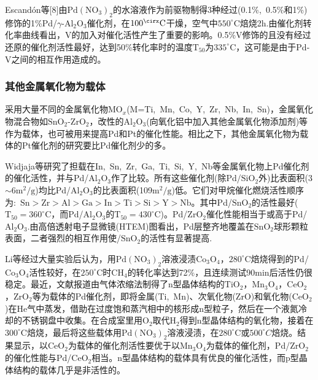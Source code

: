 \textrm{Escand\'on}等[8]由$\mathrm{Pd}(\mathrm{NO}_3)_2$的水溶液作为前驱物制得3种经过(0.1\%,~0.5\%和1\%)修饰的1\%\textrm{Pd}/$\gamma$-$\mathrm{Al}_2\mathrm{O}_3$催化剂，在$100^{\cirx}\mathrm{C}$干燥，空气中$550^{\circ}\mathrm{C}$焙烧2\textrm{h}.由催化剂转化率曲线看出，\textrm{V}的加入对催化活性产生了重要的影响。0.5\%\textrm{V}修饰的且没有经过还原的催化剂活性最好，达到50\%转化率时的温度$\mathrm{T}_{50}$为$335^{\circ}\mathrm{C}$，这可能是由于\textrm{Pd}-\textrm{V}之间的相互作用造成的。

\subsubsection{其他金属氧化物为载体}
采用大量不同的金属氧化物$\mathrm{MO}_x$(\textrm{M=Ti,~Mn,~Co,~Y,~Zr,~Nb,~In,~Sn})，金属氧化物混合物如$\mathrm{SnO}_2$-$\mathrm{ZrO}_2$，改性的$\mathrm{Al}_2\mathrm{O}_3$(向氧化铝中加入其他金属氧化物添加剂)等作为载体，也可被用来提高\textrm{Pd}和\textrm{Pt}的催化性能。相比之下，其他金属氧化物为载体的\textrm{Pt}催化剂的研究要比\textrm{Pd}催化剂少的多。

\textrm{Widjaja}等\cite{CataD59-69_2000}研究了担载在\textrm{In,~Sn,~Zr,~Ga,~Ti,~Si,~Y,~Nb}等金属氧化物上\textrm{Pd}催化剂的催化活性，并与\textrm{Pd}/$\mathrm{Al}_2\mathrm{O}_3$作了比较。所有这些催化剂(除\textrm{Pd}/$\mathrm{SiO}_2$外)比表面积(3$\sim$6$\mathrm{m}^2/\mathrm{g}$)均比\textrm{Pd}/$\mathrm{Al}_2\mathrm{O}_3$的比表面积(109$\mathrm{m}^2/\mathrm{g}$)低。它们对甲烷催化燃烧活性顺序为:~$\mathrm{Sn}>\mathrm{Zr}>\mathrm{Al}>\mathrm{Ga}>\mathrm{In}>\mathrm{Ti}>\mathrm{Si}>\mathrm{Y}>\mathrm{Nb}$。其中\textrm{Pd}/$\mathrm{SnO}_2$的活性最好($\mathrm{T}_{50}=360^{\circ}\mathrm{C}$，而\textrm{Pd}/$\mathrm{Al}_2\mathrm{O}_3$的$\mathrm{T}_{50}=430^{\circ}\mathrm{C}$)。\textrm{Pd}/$\mathrm{ZrO}_2$催化性能相当于或高于\textrm{Pd}/$\mathrm{Al}_2\mathrm{O}_3$.由高倍透射电子显微镜(\textrm{HTEM})图看出，\textrm{Pd}层整齐地覆盖在$\mathrm{SnO}_2$球形颗粒表面，二者强烈的相互作用使/$\mathrm{SnO}_2$的活性有显著提高.

\textrm{Li}等\cite{RKCL66-367_1999}经过大量实验后认为，用$\mathrm{Pd}(\mathrm{NO}_3)_2$溶液浸渍$\mathrm{Co}_3\mathrm{O}_4$，$280^{\circ}\mathrm{C}$焙烧得到的\textrm{Pd}/$\mathrm{Co}_3\mathrm{O}_4$活性较好，在$250^{\circ}\mathrm{C}$时$\mathrm{CH}_4$的转化率达到72\%，且连续测试90\textrm{min}后活性仍很稳定。最近，文献\cite{RKCL70-97_2000}报道由气体浓缩法制得了\textrm{n}型晶体结构的$\mathrm{TiO}_2$，$\mathrm{Mn}_3\mathrm{O}_4$，$\mathrm{CeO}_2$，$\mathrm{ZrO}_2$等为载体的\textrm{Pd}催化剂，即将金属(\textrm{Ti,~Mn})、次氧化物(\textrm{ZrO})和氧化物($\mathrm{CeO}_2$)在\textrm{He}气中蒸发，借助在过度饱和蒸汽相中的核形成\textrm{n}型粒子，然后在一个液氮冷却的不锈钢盘中收集。在合成室里用$\mathrm{O}_2$取代$\mathrm{H}_2$得到\textrm{n}型晶体结构的氧化物，接着在$300^{\circ}\mathrm{C}$焙烧，最后将这些载体用$\mathrm{Pd}(\mathrm{NO}_3)_2$溶液浸渍，在$280^{\circ}\mathrm{C}$或$500^{\circ}{C}$焙烧。结果显示，以$\mathrm{CeO}_2$为载体的催化剂活性要优于以$\mathrm{Mn}_3\mathrm{O}_4$为载体的催化剂，\textrm{Pd}/$\mathrm{ZrO}_2$的催化性能与\textrm{Pd}/$\mathrm{CeO}_2$相当。\textrm{n}型晶体结构的载体具有优良的催化活性，而\textrm{p}型晶体结构的载体几乎是非活性的。

